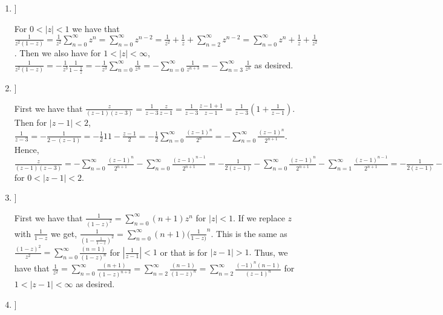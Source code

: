 \documentclass{article}
\theoremstyle{definition}
\begin{document}
\begin{enumerate}
\begin{enumerate}
    \end{enumerate}
    
    \item [[\phantom{-}4]]
    
    For $0 < |z| < 1$ we have that $\frac{1}{z^2(1 - z)} = \frac{1}{z^2}\sum_{n = 0}^\infty z^n = \sum_{n = 0}^\infty z^{n - 2} = \frac{1}{z^2} + \frac{1}{z} + \sum_{n = 2}^\infty z^{n - 2} = \sum_{n = 0}^\infty z^n + \frac{1}{z} + \frac{1}{z^2}$. Then we also have for $1 < |z| < \infty$, $\frac{1}{z^2(1 - z)} = -\frac{1}{z^3}\frac{1}{1 - \frac{1}{z}} = -\frac{1}{z^3}\sum_{n = 0}^\infty\frac{1}{z^n} = -\sum_{n = 0}^\infty \frac{1}{z^{n + 3}} = -\sum_{n = 3}^\infty\frac{1}{z^n}$ as desired. 
    
    \item [[\phantom{-}6]]
    
    First we have that $\frac{z}{(z - 1)(z - 3)} = \frac{1}{z-3}\frac{z}{z-1} = \frac{1}{z-3}\frac{z-1+1}{z-1} = \frac{1}{z - 3}(1 + \frac{1}{z - 1})$. Then for $|z - 1| < 2$, $\frac{1}{z - 3} = -\frac{1}{2 - (z - 1)} = -\frac{1}{2}{1}{1 - \frac{z-1}{2}} = -\frac{1}{2}\sum_{n = 0}^\infty \frac{(z - 1)^n}{2^n} = -\sum_{n = 0}^\infty\frac{(z - 1)^n}{2^{n + 1}}.$ Hence, $\frac{z}{(z - 1)(z - 3)} = -\sum_{n = 0}^\infty\frac{(z - 1)^n}{2^{n + 1}} - \sum_{n = 0}^\infty\frac{(z - 1)^{n - 1}}{2^{n + 1}} = -\frac{1}{2(z - 1)} - \sum_{n = 0}^\infty \frac{(z - 1)^n}{2^{n + 1}}-\sum_{n = 1}^\infty \frac{(z - 1)^{n - 1}}{2^{n + 1}} = -\frac{1}{2(z - 1)} - \sum_{n = 0}^\infty \frac{(z - 1)^n}{2^{n + 1}} - \sum_{n = 0}^\infty\frac{(z - 1)^n}{2^{n + 2}} = -\frac{1}{2(z - 1)} - 3\sum_{n = 0}^\infty \frac{(z - 1)^n}{2^{n + 2}}$ for $0 < |z - 1| < 2.$
    
    \item [[\phantom{-}2]]
    
    First we have that $\frac{1}{(1 - z)^2} = \sum_{n = 0}^\infty(n + 1)z^n$ for $|z| < 1$. If we replace $z$ with $\frac{1}{1 - z}$ we get, $\frac{1}{(1 - \frac{1}{1 - z})^2} = \sum_{n = 0}^\infty(n + 1)(\frac{1}{1 - z)}^n$. This is the same as $\frac{(1 - z)^2}{z^2} = \sum_{n = 0}^\infty \frac{(n = 1)}{(1 - z)^n}$ for $|\frac{1}{z - 1}| < 1$ or that is for $|z - 1| > 1.$ Thus, we have that $\frac{1}{z^2} = \sum_{n = 0}^\infty \frac{(n + 1)}{(1 - z)^{n + 2}} = \sum_{n = 2}^\infty\frac{(n - 1)}{(1 - z)^n} = \sum_{n = 2}^\infty\frac{(-1)^n(n - 1)}{(z - 1)^n}$ for $1 < |z - 1| < \infty$ as desired.
    
    \item [[\phantom{-}1]]
    

\end{enumerate}
\end{document}
